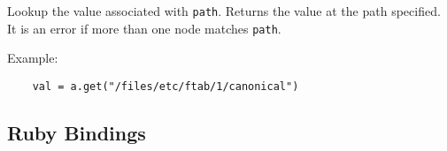 Lookup the value associated with \verb!path!. Returns the value at the path specified. It is an error if more than one node matches \verb!path!.

Example:

\begin{verbatim}
    val = a.get("/files/etc/ftab/1/canonical")
\end{verbatim}

\subsection{Ruby Bindings}





